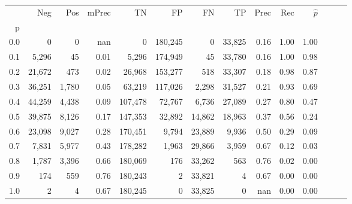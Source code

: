 \begin{tabular}{rrrrrrrrrrrrrr}
\toprule
{} &     Neg &    Pos & mPrec &       TN &       FP &      FN &      TP &  Prec &   Rec & $\hat{p}$ \\
p   &         &        &       &          &          &         &         &       &       &           \\
\midrule
0.0 &       0 &      0 &   nan &        0 &  180,245 &       0 &  33,825 &  0.16 &  1.00 &      1.00 \\
0.1 &   5,296 &     45 &  0.01 &    5,296 &  174,949 &      45 &  33,780 &  0.16 &  1.00 &      0.98 \\
0.2 &  21,672 &    473 &  0.02 &   26,968 &  153,277 &     518 &  33,307 &  0.18 &  0.98 &      0.87 \\
0.3 &  36,251 &  1,780 &  0.05 &   63,219 &  117,026 &   2,298 &  31,527 &  0.21 &  0.93 &      0.69 \\
0.4 &  44,259 &  4,438 &  0.09 &  107,478 &   72,767 &   6,736 &  27,089 &  0.27 &  0.80 &      0.47 \\
0.5 &  39,875 &  8,126 &  0.17 &  147,353 &   32,892 &  14,862 &  18,963 &  0.37 &  0.56 &      0.24 \\
0.6 &  23,098 &  9,027 &  0.28 &  170,451 &    9,794 &  23,889 &   9,936 &  0.50 &  0.29 &      0.09 \\
0.7 &   7,831 &  5,977 &  0.43 &  178,282 &    1,963 &  29,866 &   3,959 &  0.67 &  0.12 &      0.03 \\
0.8 &   1,787 &  3,396 &  0.66 &  180,069 &      176 &  33,262 &     563 &  0.76 &  0.02 &      0.00 \\
0.9 &     174 &    559 &  0.76 &  180,243 &        2 &  33,821 &       4 &  0.67 &  0.00 &      0.00 \\
1.0 &       2 &      4 &  0.67 &  180,245 &        0 &  33,825 &       0 &   nan &  0.00 &      0.00 \\
\bottomrule
\end{tabular}

